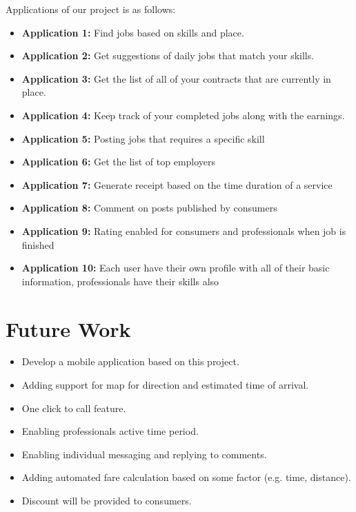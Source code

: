 Applications of our project is as follows:
\begin{itemize}
\item \textbf{Application 1: } Find jobs based on skills and place.
\item \textbf{Application 2: } Get suggestions of daily jobs that match your skills.
\item \textbf{Application 3: } Get the list of all of your contracts that are currently in place.
\item \textbf{Application 4: } Keep track of your completed jobs along with the earnings.
\item \textbf{Application 5: } Posting jobs that requires a specific skill
\item \textbf{Application 6: } Get the list of top employers
\item \textbf{Application 7: } Generate receipt based on the time duration of a service
\item \textbf{Application 8: } Comment on posts published by consumers
\item \textbf{Application 9: } Rating enabled for consumers and professionals when job is finished
\item \textbf{Application 10: } Each user have their own profile with all of their basic information, professionals have their skills also

\end{itemize}

\clearpage

\section{Future Work}
\begin{itemize}
\item Develop a mobile application based on this project.
\item Adding support for map for direction and estimated time of arrival.
\item One click to call feature.
\item Enabling professionals active time period.
\item Enabling individual messaging and replying to comments.
\item Adding automated fare calculation based on some factor (e.g. time, distance).
\item Discount will be provided to consumers.
\end{itemize}

\clearpage



